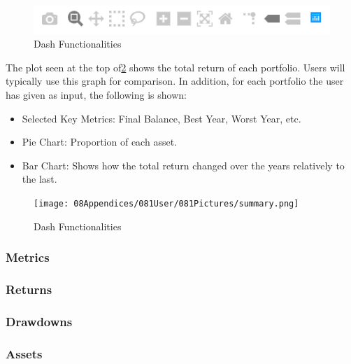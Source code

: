 \documentclass[main.tex]{subfiles}
\begin{document}
\begin{figure}[H]
   \centering
   \includegraphics[width=\textwidth]{08Appendices/081User/081Pictures/dash_funcionalities.png}
   \caption{Dash Functionalities}
   \label{dash_functionalities}
\end{figure}

The plot seen at the top of\figurename{\ref{summary}} shows the total return of each portfolio. Users will typically use this graph for comparison. In addition, for each portfolio the user has given as input, the following is shown:
\begin{itemize}
    \item Selected Key Metrics: Final Balance, Best Year, Worst Year, etc.
    \item Pie Chart: Proportion of each asset.
    \item Bar Chart: Shows how the total return changed over the years relatively to the last.
\end{itemize}

\begin{figure}[H]
   \centering
   \texttt{[image: 08Appendices/081User/081Pictures/summary.png]}
   \caption{Dash Functionalities}
   \label{summary}
\end{figure}


\subsubsection*{Metrics}
\subsubsection*{Returns}
\subsubsection*{Drawdowns}
\subsubsection*{Assets}
\end{document}
